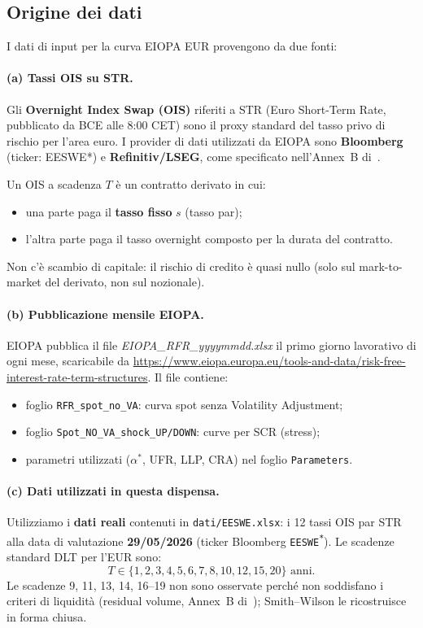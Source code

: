 \documentclass[11pt,a4paper]{article}
\theoremstyle{plain}
\theoremstyle{definition}
\theoremstyle{remark}
\begin{document}
\subsection{Origine dei dati}
\label{sec:dati-origine}

I dati di input per la curva EIOPA EUR provengono da due fonti:

\paragraph{(a) Tassi OIS su \texteuro{}STR.}
Gli \textbf{Overnight Index Swap (OIS)} riferiti a \texteuro{}STR
(Euro Short-Term Rate, pubblicato da BCE alle 8:00 CET)
sono il proxy standard del tasso privo di rischio per l'area euro.
I provider di dati utilizzati da EIOPA sono \textbf{Bloomberg} (ticker: EESWE*)
e \textbf{Refinitiv/LSEG}, come specificato nell'Annex~B di~\cite{eiopa2025}.

Un OIS a scadenza $T$ \`e un contratto derivato in cui:
\begin{itemize}
  \item una parte paga il \textbf{tasso fisso} $s$ (tasso par);
  \item l'altra parte paga il tasso overnight composto per la durata del contratto.
\end{itemize}
Non c'\`e scambio di capitale: il rischio di credito \`e quasi nullo
(solo sul mark-to-market del derivato, non sul nozionale).

\paragraph{(b) Pubblicazione mensile EIOPA.}
EIOPA pubblica il file \emph{EIOPA\_RFR\_yyyymmdd.xlsx} il primo giorno lavorativo
di ogni mese, scaricabile da
\url{https://www.eiopa.europa.eu/tools-and-data/risk-free-interest-rate-term-structures}.
Il file contiene:
\begin{itemize}
  \item foglio \texttt{RFR\_spot\_no\_VA}: curva spot senza Volatility Adjustment;
  \item foglio \texttt{Spot\_NO\_VA\_shock\_UP/DOWN}: curve per SCR (stress);
  \item parametri utilizzati ($\alpha^*$, UFR, LLP, CRA) nel foglio \texttt{Parameters}.
\end{itemize}

\paragraph{(c) Dati utilizzati in questa dispensa.}
Utilizziamo i \textbf{dati reali} contenuti in \texttt{dati/EESWE.xlsx}: i 12 tassi
OIS par \texteuro{}STR alla data di valutazione \textbf{29/05/2026} (ticker
Bloomberg \texttt{EESWE\textsuperscript{*}}). Le scadenze standard DLT per l'EUR sono:
\[
  T \in \{1, 2, 3, 4, 5, 6, 7, 8, 10, 12, 15, 20\} \text{ anni}.
\]
Le scadenze 9, 11, 13, 14, 16--19 non sono osservate perch\'e non soddisfano
i criteri di liquidit\`a (residual volume, Annex~B di~\cite{eiopa2025}); Smith--Wilson
le ricostruisce in forma chiusa.
\end{document}
